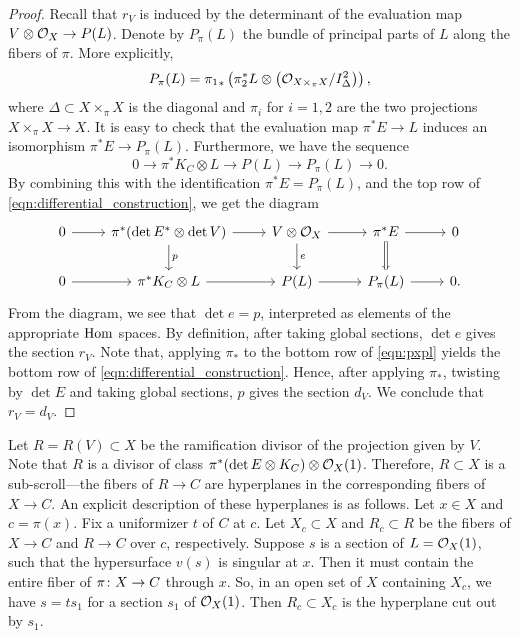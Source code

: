 \begin{proof}
  Recall that $r_V$ is induced by the determinant of the evaluation map
 $V \otimes \mathcal O_X \to P(L)$.
  Denote by $P_\pi(L)$ the bundle of principal parts of $L$ along the fibers of $\pi$.
  More explicitly,
  \[ P_\pi(L) = {\pi_1}_* \left(\pi_2^* L \otimes \left(\mathcal O_{X \times_\pi X} / I_{\Delta}^2\right)\right),\]
  where $\Delta \subset X \times_\pi X$ is the diagonal and $\pi_i$ for $i = 1,2$ are the two projections $X \times_\pi X \to X$.
  It is easy to check that the evaluation map $\pi^* E \to L$ induces an isomorphism $\pi^* E \to P_\pi(L)$.
  Furthermore, we have the sequence
  \[ 0 \to \pi^* K_C \otimes L \to P(L) \to P_\pi(L) \to 0.\]
  By combining this with the identification $\pi^* E = P_\pi(L)$, and the top row of \eqref{eqn:differential_construction}, we get the diagram
  \begin{equation}\label{eqn:pxpl}
    \begin{tikzcd}
      0 \arrow{r}& \pi^*(\det E^* \otimes \det V) \arrow{r}\arrow{d}{p}& V \otimes \O_X \arrow{r}\arrow{d}{e}& \pi^* E \arrow{r}\arrow{d}\arrow[equal]{d}& 0\\
      0 \arrow{r}& \pi^* K_C \otimes L \arrow{r}& P(L) \arrow{r}& P_\pi(L) \arrow{r}& 0.
    \end{tikzcd}
  \end{equation}
  From the diagram, we see that $\det e = p$, interpreted as elements of the appropriate $\operatorname{Hom}$ spaces.
  By definition, after taking global sections, $\det e$ gives the section $r_V$.
  Note that, applying $\pi_*$ to the bottom row of \eqref{eqn:pxpl} yields the bottom row of \eqref{eqn:differential_construction}.
  Hence, after applying $\pi_*$, twisting by $\det E$ and taking global sections, $p$ gives the section $d_V$.
  We conclude that $r_V = d_V$.
\end{proof}

Let $R = R(V) \subset X$ be the ramification divisor of the projection given by $V$.
Note that $R$ is a divisor of class $\pi^*(\det E \otimes K_C) \otimes \mathcal O_X(1)$.
Therefore, $R \subset X$ is a sub-scroll---the fibers of $R \to C$ are hyperplanes in the corresponding fibers of $X \to C$.
An explicit description of these hyperplanes is as follows.
Let $x \in X$ and $c = \pi(x)$.
Fix a uniformizer $t$ of $C$ at $c$.
Let $X_c \subset X$ and $R_c \subset R$ be the fibers of $X \to C$ and $R \to C$ over $c$, respectively.
Suppose $s$ is a section of $L = \mathcal O_X(1)$, such that the hypersurface $v(s)$ is singular at $x$.
Then it must contain the entire fiber of $\pi {\colon} X \to C$ through $x$.
So, in an open set of $X$ containing $X_c$, we have $s = t s_1$ for a section $s_1$ of $\mathcal O_X(1)$.
Then $R_c \subset X_c$ is the hyperplane cut out by $s_1$.

